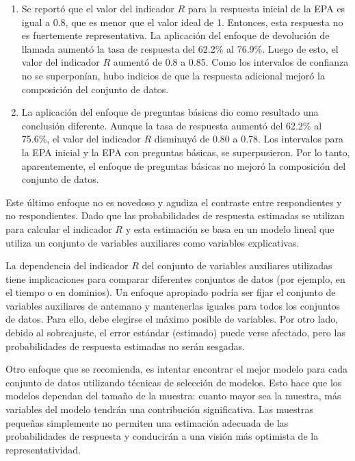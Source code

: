 \documentclass[
  12pt,
]{book}
\providecommand{\tightlist}{%
  \setlength{\itemsep}{0pt}\setlength{\parskip}{0pt}}
\begin{document}
\begin{enumerate}
\def\labelenumi{\arabic{enumi}.}
\tightlist
\item
  Se reportó que el valor del indicador \(R\) para la respuesta inicial de la EPA es igual a 0.8, que es menor que el valor ideal de 1. Entonces, esta respuesta no es fuertemente representativa. La aplicación del enfoque de devolución de llamada aumentó la
  tasa de respuesta del 62.2\% al 76.9\%. Luego de esto, el valor del indicador \(R\) aumentó de 0.8 a 0.85. Como los intervalos de confianza no se superponían, hubo indicios de que la respuesta adicional mejoró la composición del conjunto de datos.
\item
  La aplicación del enfoque de preguntas básicas dio como resultado
  una conclusión diferente. Aunque la tasa de respuesta aumentó del 62.2\% al 75.6\%, el valor del indicador \(R\) disminuyó de 0.80 a 0.78. Los intervalos para la EPA inicial y la EPA con preguntas básicas, se superpusieron. Por lo tanto, aparentemente, el enfoque de preguntas básicas no mejoró la composición del conjunto de datos.
\end{enumerate}

Este último enfoque no es novedoso y agudiza el contraste entre respondientes y no respondientes. Dado que las probabilidades de respuesta estimadas se utilizan para calcular
el indicador \(R\) y esta estimación se basa en un modelo lineal que utiliza un conjunto de variables auxiliares como variables explicativas.

La dependencia del indicador \(R\) del conjunto de variables auxiliares utilizadas tiene implicaciones para comparar diferentes conjuntos de datos (por ejemplo, en el tiempo o en dominios). Un enfoque apropiado podría ser fijar el conjunto de variables auxiliares de antemano y mantenerlas iguales para todos los conjuntos de datos. Para ello, debe elegirse el máximo posible de variables. Por otro lado, debido al sobreajuste, el error estándar (estimado) puede verse
afectado, pero las probabilidades de respuesta estimadas no serán sesgadas.

Otro enfoque que se recomienda, es intentar encontrar el mejor modelo para cada conjunto de datos utilizando técnicas de selección de modelos. Esto hace que los modelos dependan del tamaño de la muestra: cuanto
mayor sea la muestra, más variables del modelo tendrán una contribución significativa. Las muestras pequeñas simplemente no permiten una estimación adecuada de las probabilidades de respuesta y conducirán a una visión más optimista de la representatividad.
\end{document}

